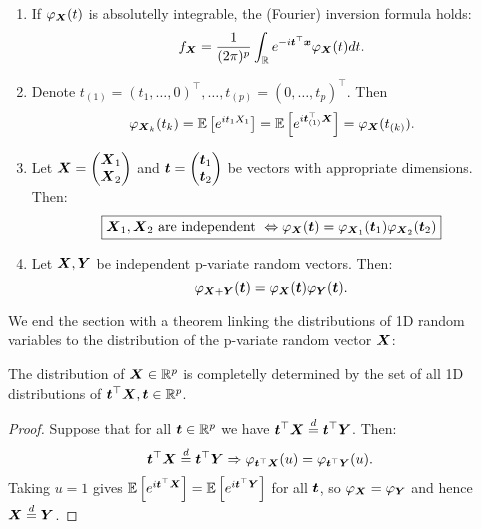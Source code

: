 \begin{enumerate}
    \item If $\phi_{\X}(t)$ is absolutelly integrable, the (Fourier) inversion formula holds:
    $$
        f_{\X} = \frac{1}{(2\pi)^p} \int_{\R} e^{-i\mt^\top\x} \phi_{\X}(t) dt.
    $$
    \item Denote $t_{(1)} = (t_1,\dots,0)^\top, \dots, t_{(p)}=(0,\dots,t_p)^\top$. Then 
    $$
        \phi_{\X_k}(t_k) = \ev{e^{it_1 X_1}} = \ev{e^{i\mt_{(1)}^\top \X}} =  \phi_{\X}(t_{(k)}).
    $$
    \item Let $\X=\begin{pmatrix} \X_1 \\ \X_2 \end{pmatrix}$ and $\mt=\begin{pmatrix} \mt_1 \\ \mt_2 \end{pmatrix}$ be vectors with appropriate dimensions. Then:
    \begin{equation}
        \boxed{\X_1, \X_2 \textrm{ are independent } \Leftrightarrow \phi_{\X}(\mt) = \phi_{\X_1}(\mt_1)\phi_{\X_2}(\mt_2)}
    \end{equation} 
    \item Let $\X, \Y$ be independent p-variate random vectors. Then:
    $$
        \phi_{\X+\Y}(\mt) = \phi_{\X}(\mt)\phi_{\Y}(\mt).
    $$
\end{enumerate}
We end the section with a theorem linking the distributions of 1D random variables to the distribution of the p-variate random vector $\X$:
\begin{theorem}
    The distribution of $\X\in\R^p$ is completelly determined by the set of all 1D distributions of $\mt^\top\X, \mt\in\R^p$.
\end{theorem}
\begin{proof}
    Suppose that for all $\mt\in\R^p$ we have $\mt^\top \X \overset{d}{=} \mt^\top \Y$. Then:
    $$
        \mt^\top \X \overset{d}{=} \mt^\top \Y \Rightarrow \phi_{\mt^\top\X}(u) = \phi_{\mt^\top\Y}(u).
    $$
    Taking $u=1$ gives $\ev{e^{i\mt^\top\X}} = \ev{e^{i\mt^\top\Y}}$ for all $\mt$, so $\phi_{\X}=\phi_{\Y}$ and hence $\X \overset{d}{=}  \Y$.
\end{proof}